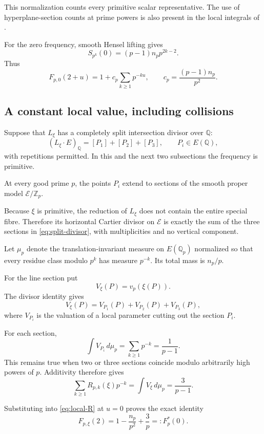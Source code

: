 \documentclass[11pt]{article}
\begin{document}
This normalization counts every primitive scalar representative.
The use of hyperplane-section counts at prime powers is also present
in the local integrals of \cite[\S3, Lemma~3.3]{CLT}.

For the zero frequency, smooth Hensel lifting
gives
\[
S_{p^k}(0)=(p-1)n_pp^{2k-2}.
\]
Thus
\begin{equation}\label{eq:zero-local}
F_{p,0}(2+u)
=
1+c_p\sum_{k\geq1}p^{-ku},
\qquad
c_p=\frac{(p-1)n_p}{p^2}.
\end{equation}

\subsection{A constant local value, including collisions}

Suppose that $L_\xi$ has a completely split
intersection divisor over $\mathbb Q$:
\begin{equation}\label{eq:split-divisor}
(L_\xi\cdot E)_{\mathbb Q}
=[P_1]+[P_2]+[P_3],
\qquad P_i\in E(\mathbb Q),
\end{equation}
with repetitions permitted. In this and the next two subsections the frequency is primitive.

At every good prime $p$, the points $P_i$
extend to sections of the smooth proper
model $\mathcal E/\mathbb Z_p$.

Because $\xi$ is primitive, the reduction
of $L_\xi$ does not contain the entire
special fibre. Therefore its horizontal
Cartier divisor on $\mathcal E$ is exactly
the sum of the three sections in
\eqref{eq:split-divisor}, with
multiplicities and no vertical component.

Let $\mu_p$ denote the translation-invariant
measure on $E(\mathbb Q_p)$ normalized so
that every residue class modulo $p^k$
has measure $p^{-k}$.
Its total mass is $n_p/p$.

For the line section put
\[
V_\xi(P)=v_p(\xi(P)).
\]
The divisor identity gives
\[
V_\xi(P)=V_{P_1}(P)+V_{P_2}(P)+V_{P_3}(P),
\]
where $V_{P_i}$ is the valuation of a
local parameter cutting out the section
$P_i$.

For each section,
\[
\int V_{P_i}\,d\mu_p
=\sum_{k\geq1}p^{-k}
=\frac1{p-1}.
\]
This remains true when two or three sections
coincide modulo arbitrarily high powers of $p$.
Additivity therefore gives
\[
\sum_{k\geq1}R_{p,k}(\xi)p^{-k}
=\int V_\xi\,d\mu_p
=\frac3{p-1}.
\]

Substituting into \eqref{eq:local-R} at $u=0$
proves the exact identity
\begin{equation}\label{eq:constant-local}
\boxed{
F_{p,\xi}(2)
=
1-\frac{n_p}{p^2}+\frac3p
=:F_p^*(0).
}
\end{equation}
\end{document}
